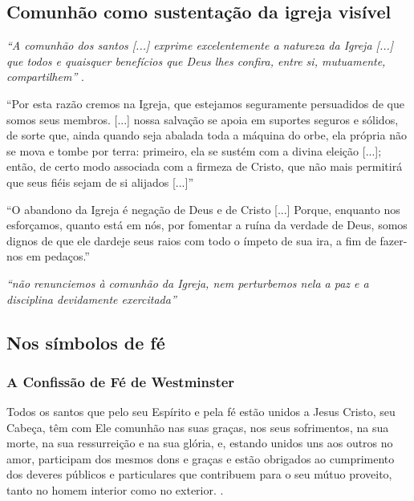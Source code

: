\subsection{Comunhão como sustentação da igreja visível}
\textit{``A comunhão dos santos [...] exprime excelentemente a natureza da Igreja [...] que todos e quaisquer benefícios que Deus lhes confira, entre si, mutuamente, compartilhem''} \cite[v. 4, p. 75-76]{calvino2022}.

\begin{citacao}
``Por esta razão cremos na Igreja, que estejamos seguramente persuadidos de que somos seus membros. [...] nossa salvação se apoia em suportes seguros e sólidos, de sorte que, ainda quando seja abalada toda a máquina do orbe, ela própria não se mova e tombe por terra: primeiro, ela se sustém com a divina eleição [...]; então, de certo modo associada com a firmeza de Cristo, que não mais permitirá que seus fiéis sejam de si alijados [...]'' \cite[v. 4, p. 75-76]{calvino2022}
\end{citacao}

\begin{citacao}
``O abandono da Igreja é negação de Deus e de Cristo [...] Porque, enquanto nos esforçamos, quanto está em nós, por fomentar a ruína da verdade de Deus, somos dignos de que ele dardeje seus raios com todo o ímpeto de sua ira, a fim de fazer-nos em pedaços.'' \cite[v. 4, p. 92]{calvino2022}
\end{citacao}

\textit{``não renunciemos à comunhão da Igreja, nem perturbemos nela a paz e a disciplina devidamente exercitada''} \cite[v. 4, p. 95]{calvino2022}

\subsection{Nos símbolos de fé}

\subsubsection{A Confissão de Fé de Westminster} 
\begin{citacao}
Todos os santos que pelo seu Espírito e pela fé estão unidos a Jesus Cristo, seu Cabeça, têm com Ele comunhão nas suas graças, nos seus sofrimentos, na sua morte, na sua ressurreição e na sua glória, e, estando unidos uns aos outros no amor, participam dos mesmos dons e graças e estão obrigados ao cumprimento dos deveres públicos e particulares que contribuem para o seu mútuo proveito, tanto no homem interior como no exterior. \cite{cfw}.
\end{citacao}

